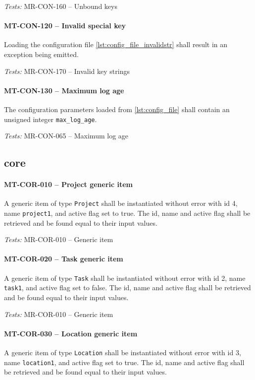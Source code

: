 \textit{Tests: } MR-CON-160 -- Unbound keys

\paragraph{MT-CON-120 -- Invalid special key}
Loading the configuration file \cref{lst:config_file_invalidstr} shall
result in an exception being emitted.

\textit{Tests: } MR-CON-170 -- Invalid key strings

\paragraph{MT-CON-130 -- Maximum log age}
The configuration parameters loaded from \cref{lst:config_file}
shall contain an unsigned integer \lstinline{max_log_age}.

\textit{Tests: } MR-CON-065 -- Maximum log age

\subsection{core}
\paragraph{MT-COR-010 -- Project generic item}
A generic item of type \lstinline{Project} shall be instantiated without
error with id 4, name \lstinline{project1}, and active flag set to true.
The id, name and active flag shall be retrieved and be found equal to
their input values.

\textit{Tests: } MR-COR-010 -- Generic item

\paragraph{MT-COR-020 -- Task generic item}
A generic item of type \lstinline{Task} shall be instantiated without
error with id 2, name \lstinline{task1}, and active flag set to false.
The id, name and active flag shall be retrieved and be found equal to
their input values.

\textit{Tests: } MR-COR-010 -- Generic item

\paragraph{MT-COR-030 -- Location generic item}
A generic item of type \lstinline{Location} shall be instantiated without
error with id 3, name \lstinline{location1}, and active flag set to true.
The id, name and active flag shall be retrieved and be found equal to
their input values.

